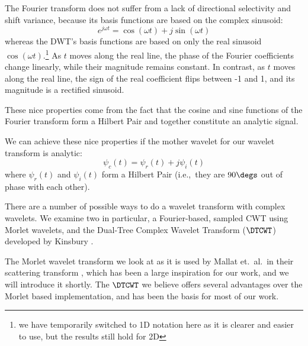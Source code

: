   The Fourier transform does not suffer from a lack of directional selectivity
  and shift variance, because its basis functions are based on the complex
  sinusoid: 
  \begin{equation} 
    e^{j\omega t} = \cos(\omega t) + j\sin(\omega t)
  \end{equation} 
  whereas the DWT's basis functions are based on only the real
  sinusoid $\cos(\omega t).$\footnote{we have temporarily switched to 1D
  notation here as it is clearer and easier to use, but the results still hold
  for 2D} As $t$ moves along the real line, the phase of the
  Fourier coefficients change linearly, while their magnitude remains constant. In
  contrast, as $t$ moves along the real line, the sign of the real coefficient
  flips between -1 and 1, and its magnitude is a rectified sinusoid.

  These nice properties come from the fact that the cosine and sine functions of the
  Fourier transform form a Hilbert Pair and together constitute an 
  analytic signal.

  We can achieve these nice properties if the mother wavelet for our wavelet
  transform is analytic:
  \begin{equation}
    \psi_{c}(t) = \psi_{r}(t) + j\psi_{i}(t) \label{eq:ch2:complex_wavelet}
  \end{equation}
  where $\psi_{r}(t)$ and $\psi_{i}(t)$ form a Hilbert Pair (i.e.,\ they are
  $90\degs$ out of phase with each other).

  There are a number of possible ways to do a wavelet transform with complex
  wavelets. We examine two in particular, a Fourier-based, sampled CWT using
  Morlet wavelets, and the Dual-Tree Complex Wavelet Transform ($\DTCWT$)
  developed by Kinsbury \cite{kingsbury_wavelet_1997, kingsbury_dual-tree_1998,
  kingsbury_dual-tree_1998-1,  kingsbury_image_1999, kingsbury_shift_1999,
  kingsbury_dual-tree_2000, kingsbury_complex_2001, selesnick_dual-tree_2005}.

  The Morlet wavelet transform we look at as it is used by 
  Mallat et.\ al.\ in their scattering transform
  \cite{bruna_classification_2011, bruna_invariant_2013, bruna_scattering_2013,
  oyallon_generic_2013, oyallon_deep_2015, sifre_rotation_2013,
  sifre_rigid-motion_2014, sifre_rigid-motion_2014-1, sifre_scatnet_2013}, which
  has been a large inspiration for our work, and we will introduce it shortly. 
  The $\DTCWT$ we believe offers
  several advantages over the Morlet based implementation, and has been the
  basis for most of our work.

